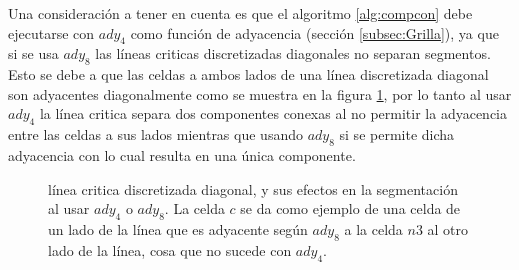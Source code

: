 Una consideración a tener en cuenta es que el algoritmo \ref{alg:compcon} debe
ejecutarse con $ady_4$ como función de adyacencia (sección
\ref{subsec:Grilla}), ya que si se usa $ady_8$ las líneas criticas
discretizadas diagonales no separan segmentos. Esto se debe a que las celdas a ambos lados de una línea
discretizada diagonal son adyacentes diagonalmente como se muestra en la figura
\ref{fig:probDiagSeg}, por lo tanto al usar $ady_4$ la línea critica separa dos
componentes conexas al no permitir la adyacencia entre las celdas a sus lados
mientras que usando $ady_8$ si se permite dicha adyacencia con lo cual resulta
en una única componente.

\begin{figure}[H]
  \centerfloat


  \qquad

  \caption[línea critica discretizada diagonal, y sus efectos en la
  segmentacion al usar $ady_4$ o $ady_8$.]{línea critica discretizada diagonal, y sus efectos en la
  segmentación al usar $ady_4$ o $ady_8$. La celda $c$ se da como ejemplo de
una celda de un lado de la línea que es adyacente según $ady_8$ a la celda $n3$ al 
otro lado de la línea, cosa que no sucede con $ady_4$.}\label{fig:probDiagSeg}

\end{figure}

